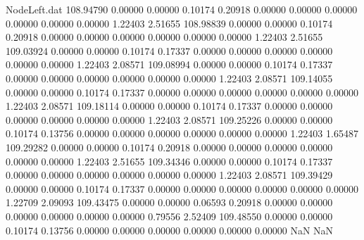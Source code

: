 \begin{filecontents}{NodeLeft.dat}
 108.94790    0.00000    0.00000     0.10174    0.20918    0.00000    0.00000    0.00000    0.00000    0.00000    0.00000    1.22403    2.51655
 108.98839    0.00000    0.00000     0.10174    0.20918    0.00000    0.00000    0.00000    0.00000    0.00000    0.00000    1.22403    2.51655
 109.03924    0.00000    0.00000     0.10174    0.17337    0.00000    0.00000    0.00000    0.00000    0.00000    0.00000    1.22403    2.08571
 109.08994    0.00000    0.00000     0.10174    0.17337    0.00000    0.00000    0.00000    0.00000    0.00000    0.00000    1.22403    2.08571
 109.14055    0.00000    0.00000     0.10174    0.17337    0.00000    0.00000    0.00000    0.00000    0.00000    0.00000    1.22403    2.08571
 109.18114    0.00000    0.00000     0.10174    0.17337    0.00000    0.00000    0.00000    0.00000    0.00000    0.00000    1.22403    2.08571
 109.25226    0.00000    0.00000     0.10174    0.13756    0.00000    0.00000    0.00000    0.00000    0.00000    0.00000    1.22403    1.65487
 109.29282    0.00000    0.00000     0.10174    0.20918    0.00000    0.00000    0.00000    0.00000    0.00000    0.00000    1.22403    2.51655
 109.34346    0.00000    0.00000     0.10174    0.17337    0.00000    0.00000    0.00000    0.00000    0.00000    0.00000    1.22403    2.08571
 109.39429    0.00000    0.00000     0.10174    0.17337    0.00000    0.00000    0.00000    0.00000    0.00000    0.00000    1.22709    2.09093
 109.43475    0.00000    0.00000     0.06593    0.20918    0.00000    0.00000    0.00000    0.00000    0.00000    0.00000    0.79556    2.52409
 109.48550    0.00000    0.00000     0.10174    0.13756    0.00000    0.00000    0.00000    0.00000    0.00000    0.00000        NaN        NaN
\end{filecontents}
